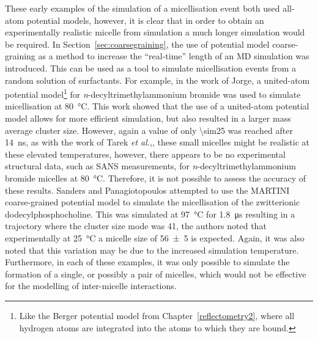 These early examples of the simulation of a micellisation event both used all-atom potential models,\autocite{tarek_molecular_1998,maillet_large_1999} however, it is clear that in order to obtain an experimentally realistic micelle from simulation a much longer simulation would be required.
In Section~\ref{sec:coarsegraining}, the use of potential model coarse-graining as a method to increase the ``real-time'' length of an MD simulation was introduced.
This can be used as a tool to simulate micellisation events from a random solution of surfactants.
For example, in the work of Jorge,\autocite{jorge_molecular_2008} a united-atom potential model\footnote{Like the Berger potential model from Chapter~\ref{reflectometry2}, where all hydrogen atoms are integrated into the atoms to which they are bound.} for \emph{n}-decyltrimethylammonium bromide was used to simulate micellisation at \SI{80}{\celsius}.
This work showed that the use of a united-atom potential model allows for more efficient simulation, but also resulted in a larger mass average cluster size.
However, again a value of only \num{\sim25} was reached after \SI{14}{\nano\second}, as with the work of Tarek \emph{et al.},\autocite{tarek_molecular_1998}, these small micelles might be realistic at these elevated temperatures, however, there appears to be no experimental structural data, such as SANS measurements, for \emph{n}-decyltrimethylammonium bromide micelles at \SI{80}{\celsius}.
Therefore, it is not possible to assess the accuracy of these results.
Sanders and Panagiotopoulos attempted to use the MARTINI coarse-grained potential model to simulate the micellisation of the zwitterionic dodecylphosphocholine.\autocite{sanders_micellization_2010}
This was simulated at \SI{97}{\celsius} for \SI{1.8}{\micro\second} resulting in a trajectory where the cluster size mode was 41, the authors noted that experimentally at \SI{25}{\celsius} a micelle size of \num{56\pm5} is expected.
Again, it was also noted that this variation may be due to the increased simulation temperature.\autocite{malliaris_temperature_1985,kamenka_aqueous_1995}
Furthermore, in each of these examples, it was only possible to simulate the formation of a single, or possibly a pair of micelles, which would not be effective for the modelling of inter-micelle interactions.

